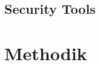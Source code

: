 \documentclass[12pt,oneside,a4paper,parskip]{scrbook}
\begin{document}


  \section{Security Tools}


\chapter{Methodik}
\end{document}
